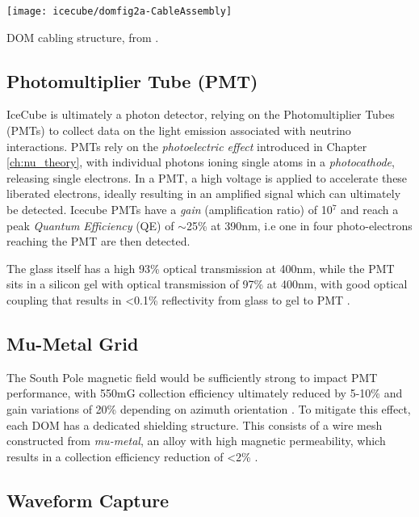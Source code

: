 \begin{marginfigure}
	\centering \texttt{[image: icecube/domfig2a-CableAssembly]}
	\caption{DOM cabling structure, from \cite{icecube_detector_17}.}
	\label{fig:dom_cable}
\end{marginfigure} 

\subsection*{Photomultiplier Tube (PMT)}

IceCube is ultimately a photon detector, relying on the Photomultiplier Tubes (PMTs) to collect data on the light emission associated with neutrino interactions. PMTs rely on the \emph{photoelectric effect} introduced in Chapter \ref{ch:nu_theory}, with individual photons ioning single atoms in a \emph{photocathode}, releasing single electrons. In a PMT, a high voltage is applied to accelerate these liberated electrons, ideally resulting in an amplified signal which can ultimately be detected. Icecube PMTs have a \emph{gain} (amplification ratio) of 10$^{7}$ and reach a peak \emph{Quantum Efficiency} (QE) of $\sim$25\% at 390nm, i.e one in four photo-electrons reaching the PMT are then detected. 

The glass itself has a high 93\% optical transmission at 400nm, while the PMT sits in a silicon gel with optical transmission of 97\% at 400nm, with good optical coupling that results in <0.1\% reflectivity from glass to gel to PMT \cite{icecube_detector_17}. 

\subsection*{Mu-Metal Grid}

The South Pole magnetic field would be sufficiently strong to impact PMT performance, with 550mG collection efficiency ultimately reduced by 5-10\% and gain variations of 20\% depending on azimuth orientation \cite{icecube_detector_17}. To mitigate this effect, each DOM has a dedicated shielding structure. This consists of a wire mesh constructed from \emph{mu-metal}, an alloy with high magnetic permeability, which results in a collection efficiency reduction of <2\% \cite{icecube_detector_17}. 

\subsection*{Waveform Capture}


